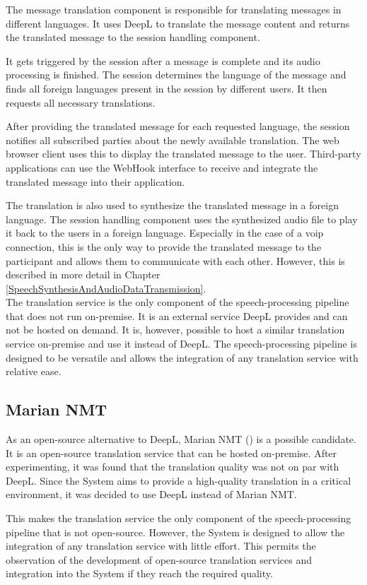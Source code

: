 The message translation component is responsible for translating messages in different languages. It uses DeepL to 
translate the message content and returns the translated message to the session handling component.

It gets triggered by the session after a message is complete and its audio processing is finished. The session 
determines the language of the message and finds all foreign languages present in the session by different users. 
It then requests all necessary translations. 

After providing the translated message for each requested language, the session notifies all subscribed parties about 
the newly available translation. The web browser client uses this to display the translated message to the user. 
Third-party applications can use the WebHook interface to receive and integrate the translated message into their 
application.

The translation is also used to synthesize the translated message in a foreign language. The session handling component 
uses the synthesized audio file to play it back to the users in a foreign language. Especially in the case of a 
\ac{voip} connection, this is the only way to provide the translated message to the participant and allows them to 
communicate with each other. However, this is described in more detail in Chapter 
\ref{SpeechSynthesisAndAudioDataTransmission}.\\

The translation service is the only component of the speech-processing pipeline that does not run on-premise. It is an 
external service DeepL provides and can not be hosted on demand. It is, however, possible to host a similar translation 
service on-premise and use it instead of DeepL. The speech-processing pipeline is designed to be versatile and allows 
the integration of any translation service with relative ease.

\subsection{Marian NMT}

As an open-source alternative to DeepL, Marian NMT (\cite{mariannmt}) is a possible candidate. It is an open-source 
translation service that can be hosted on-premise. After experimenting, it was found that the translation quality was 
not on par with DeepL. Since the System aims to provide a high-quality translation in a critical environment, it was 
decided to use DeepL instead of Marian NMT.

This makes the translation service the only component of the speech-processing pipeline that is not open-source. 
However, the System is designed to allow the integration of any translation service with little effort. This permits 
the observation of the development of open-source translation services and integration into the System if they reach 
the required quality.
